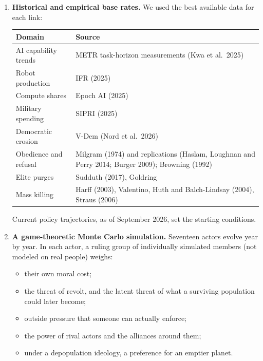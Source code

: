 \documentclass[
  10pt,
]{article}
\newcounter{none} %
\providecommand{\tightlist}{%
  \setlength{\itemsep}{0pt}\setlength{\parskip}{0pt}}
\begin{document}
\begin{enumerate}
\def\labelenumi{\arabic{enumi}.}
\item
  \textbf{Historical and empirical base rates.} We used the best available data for each link:

  {\def\LTcaptype{none} %
  \begin{longtable}[]{@{}
    >{\raggedright\arraybackslash}p{}
    >{\raggedright\arraybackslash}p{}@{}}
  \toprule\noalign{}
  \begin{minipage}[b]{\linewidth}\raggedright
  Domain
  \end{minipage} & \begin{minipage}[b]{\linewidth}\raggedright
  Source
  \end{minipage} \\
  \midrule\noalign{}
  \endhead
  \bottomrule\noalign{}
  \endlastfoot
  AI capability trends & METR task-horizon measurements (Kwa et al.~2025) \\
  Robot production & IFR (2025) \\
  Compute shares & Epoch AI (2025) \\
  Military spending & SIPRI (2025) \\
  Democratic erosion & V-Dem (Nord et al.~2026) \\
  Obedience and refusal & Milgram (1974) and replications (Haslam, Loughnan and Perry 2014; Burger
  2009); Browning (1992) \\
  Elite purges & Sudduth (2017), Goldring \\
  Mass killing & Harff (2003), Valentino, Huth and Balch-Lindsay (2004), Straus (2006) \\
  \end{longtable}
  }

  Current policy trajectories, as of September 2026, set the starting conditions.
\item
  \textbf{A game-theoretic Monte Carlo simulation.} Seventeen actors evolve year by year. In each
  actor, a ruling group of individually simulated members (not modeled on real people) weighs:

  \begin{itemize}
  \tightlist
  \item
    their own moral cost;
  \item
    the threat of revolt, and the latent threat of what a surviving population could later become;
  \item
    outside pressure that someone can actually enforce;
  \item
    the power of rival actors and the alliances around them;
  \item
    under a depopulation ideology, a preference for an emptier planet.
  \end{itemize}


\end{enumerate}
\end{document}
